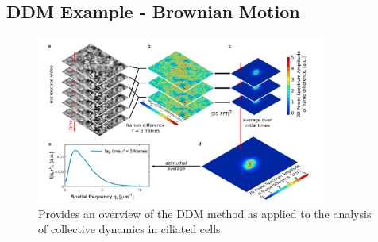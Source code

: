 \documentclass[11pt]{article}
\begin{document}
\subsection{DDM Example - Brownian Motion}

\begin{figure}[H]
\centering
\includegraphics[height=5.5cm]{images/ddmpic.png}
\caption{Provides an overview of the DDM method as applied to the analysis of collective dynamics in ciliated cells.\cite{ddm2}}
\end{figure}
\end{document}

